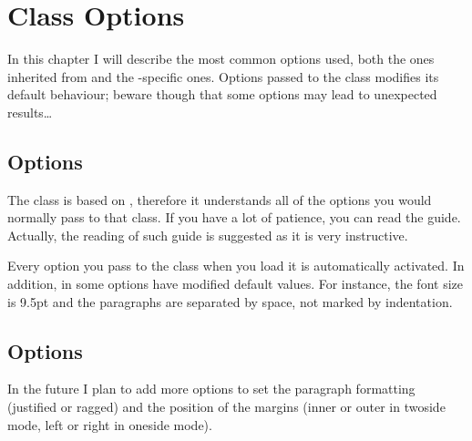 \setchapterpreamble[u]{\margintoc}
\chapter{Class Options}

In this chapter I will describe the most common options used, both the 
ones inherited from  and the -specific ones. 
Options passed to the class modifies its default behaviour; beware 
though that some options may lead to unexpected results\ldots

\section{ Options}

The  class is based on , therefore it 
understands all of the options you would normally pass to that class. If 
you have a lot of patience, you can read the \KOMAScript\xspace 
{}guide. Actually, the reading 
of such guide is suggested as it is very instructive.

Every \KOMAScript\xspace {}option you pass to the class when you load it 
is automatically activated. In addition, in  some options 
have modified default values. For instance, the font size is 9.5pt and 
the paragraphs are separated by space, not marked by indentation.

\section{ Options}

In the future I plan to add more options to set the paragraph formatting 
(justified or ragged) and the position of the margins (inner or outer in 
twoside mode, left or right in oneside mode).

